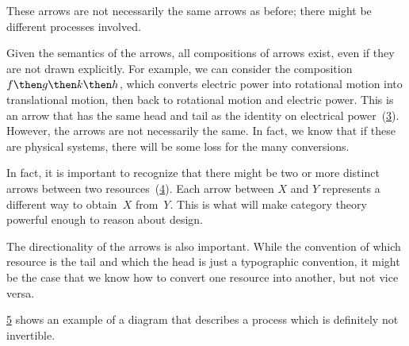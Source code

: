 \begin{figure}[h!]
    \centering
    \caption{\label{fig:e6}}
\end{figure}

These arrows are not necessarily the same arrows as before; there might be different processes
involved.

\begin{figure}[h!]
    \centering
    \caption{\label{fig:e6-together}}
\end{figure}

Given the semantics of the arrows, all compositions of arrows exist, even if they are not drawn
explicitly. For example, we can consider the composition~$f\then g \then k \then h$, which
converts electric power into rotational motion into translational motion, then back to
rotational motion and electric power. This is an arrow that has the same head and tail as the
identity on electrical power~(\cref{fig:e8}). However, the arrows are not necessarily the same. In fact, we know that if these are physical systems, there will be some loss for the many conversions.

\begin{figure}[h!]
    \centering
    \caption{\label{fig:e8}}
\end{figure}

In fact, it is important to recognize that there might be two or more distinct
arrows between two resources~(\cref{fig:e9}). Each arrow between $X$ and $Y$ represents a different way  to obtain~$X$ from~$Y$. This is what will make category theory powerful enough to reason about design.


\begin{figure}[h!]
    \centering
    \caption{\label{fig:e9}}
\end{figure}

The directionality of the arrows is also important. While the convention of
which resource is the tail and which the head is just a typographic convention,
it might be the case that we know how to convert one resource into another, but
not vice versa.

\cref{fig:e10} shows an example of a diagram that describes a process which is definitely
not invertible.

\begin{figure}[h!]
    \centering
    \caption{\label{fig:e10}}
\end{figure}
